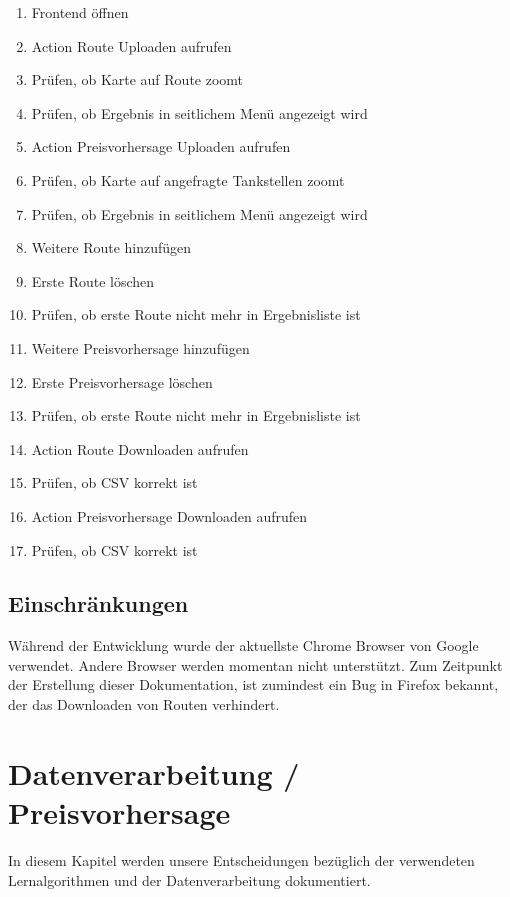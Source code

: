\documentclass[
ngerman          %
,a4paper          %
,11pt
,pdftex
]{report}
\begin{document}
\begin{enumerate}
\item Frontend öffnen
\item Action Route Uploaden aufrufen
\item Prüfen, ob Karte auf Route zoomt
\item Prüfen, ob Ergebnis in seitlichem Menü angezeigt wird
\item Action Preisvorhersage Uploaden aufrufen
\item Prüfen, ob Karte auf angefragte Tankstellen zoomt
\item Prüfen, ob Ergebnis in seitlichem Menü angezeigt wird
\item Weitere Route hinzufügen
\item Erste Route löschen
\item Prüfen, ob erste Route nicht mehr in Ergebnisliste ist
\item Weitere Preisvorhersage hinzufügen
\item Erste Preisvorhersage löschen
\item Prüfen, ob erste Route nicht mehr in Ergebnisliste ist
\item Action Route Downloaden aufrufen
\item Prüfen, ob CSV korrekt ist
\item Action Preisvorhersage Downloaden aufrufen
\item Prüfen, ob CSV korrekt ist
\end{enumerate}

\subsection{Einschränkungen}

Während der Entwicklung wurde der aktuellste Chrome Browser von Google verwendet. Andere Browser werden momentan nicht unterstützt. Zum Zeitpunkt der Erstellung dieser Dokumentation, ist zumindest ein Bug in Firefox bekannt, der das Downloaden von Routen verhindert.



\section{Datenverarbeitung / Preisvorhersage} \label{feng}
In diesem Kapitel werden unsere Entscheidungen bezüglich der verwendeten Lernalgorithmen und der Datenverarbeitung dokumentiert. 
\end{document}
